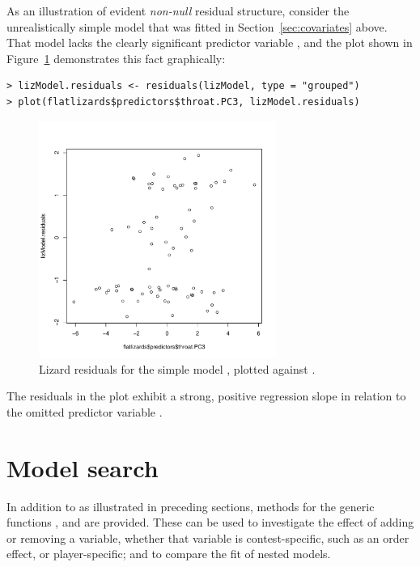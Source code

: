 As an illustration of evident \emph{non-null} residual structure, consider the
unrealistically simple model  that was fitted in
Section~\ref{sec:covariates} above.
That model lacks the
clearly significant predictor variable , and the
plot shown in Figure~\ref{fig:residuals} demonstrates this fact
graphically:
\begin{verbatim}
> lizModel.residuals <- residuals(lizModel, type = "grouped")
> plot(flatlizards$predictors$throat.PC3, lizModel.residuals)
\end{verbatim}
%
\begin{figure}[t!]
    \centering
        \includegraphics[width=0.69\textwidth]{residuals.pdf}
    \caption{Lizard residuals for the simple model , plotted
    against .\label{fig:residuals}}
\end{figure}
%
The residuals in the plot exhibit a strong, positive regression slope in
relation to the omitted predictor variable .


\section{Model search}
\label{sec:model}

In addition to  as illustrated in preceding sections,
methods for the
generic functions ,  and
 are provided. These
can be used to investigate the effect of adding or removing a variable, whether
that variable is contest-specific, such as an order effect, or player-specific;
and to compare the fit of nested models.


